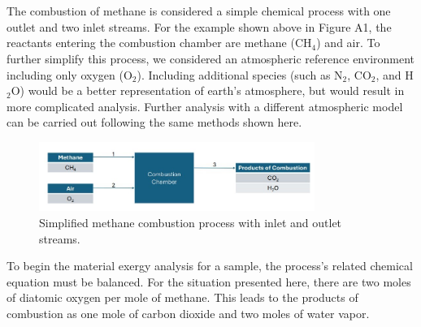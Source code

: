 \documentclass[journal,article,submit,pdftex,moreauthors]{Definitions/mdpi}
\begin{document}
\appendixstart
\appendix
\section[\appendixname~\thesection]{}
\subsection[\appendixname~\thesubsection]{}



The combustion of methane is considered a simple chemical process with one outlet and two inlet streams.
For the example shown above in Figure A1, the reactants entering the combustion chamber are methane (CH$_4$) and air.
To further simplify this process, we considered an atmospheric reference environment including only oxygen (O$_2$).
Including additional species (such as N$_2$, CO$_2$, and H$_2$O) would be a better representation of earth's atmosphere, but would result in more complicated analysis.
Further analysis with a different atmospheric model can be carried out following the same methods shown here.

\begin{figure}
\centering
\includegraphics[width=0.8\textwidth]{Definitions/images/combustion1}
\caption{Simplified methane combustion process with inlet and outlet streams.}
\label{fig:combustion_process}
\end{figure}

To begin the material exergy analysis for a sample,
the process's related chemical equation must be balanced.
For the situation presented here,
there are two moles of diatomic oxygen per mole of methane.
This leads to the products of combustion as
one mole of carbon dioxide and two moles of water vapor. %
\end{document}

